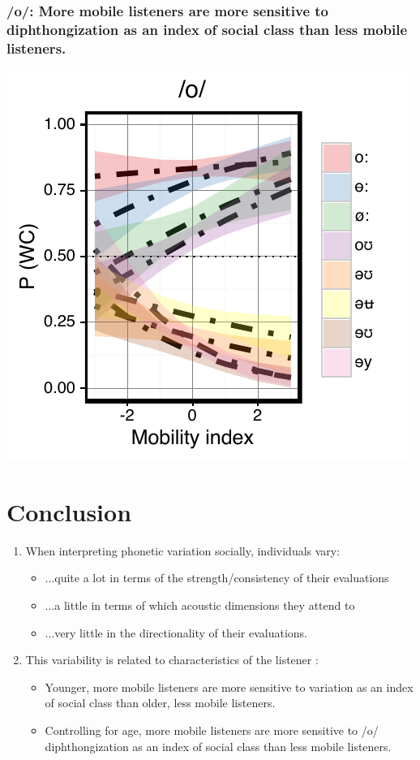 \documentclass[a0,portrait]{a0poster}
\begin{document}
\begin{multicols}{4}
\subsubsection*{/o/: More mobile listeners are more sensitive to diphthongization as an index of social class than less mobile listeners.}
\centering
\includegraphics[scale=2]{o_perception_dim3_sd.pdf}
\justify
\vspace*{-2.75cm}
\section*{Conclusion}
\vspace*{-.5cm}
\begin{enumerate}
\item{When interpreting phonetic variation socially, individuals vary:\vspace*{0.5cm}\begin{itemize}\item{...quite a lot in terms of the strength/consistency of their evaluations}\item{...a little in terms of which acoustic dimensions they attend to}\item{...very little in the directionality of their evaluations.}\end{itemize}}
\vspace*{0.5cm}
\item{This variability is related to characteristics of the listener :\vspace*{0.5cm}\begin{itemize}\item{Younger, more mobile listeners are more sensitive to  variation as an index of social class than older, less mobile listeners.}\item{Controlling for age, more mobile listeners are more sensitive to /o/ diphthongization as an index of social class than less mobile listeners.}\end{itemize}}
\end{enumerate}


\end{multicols}
\end{document}
